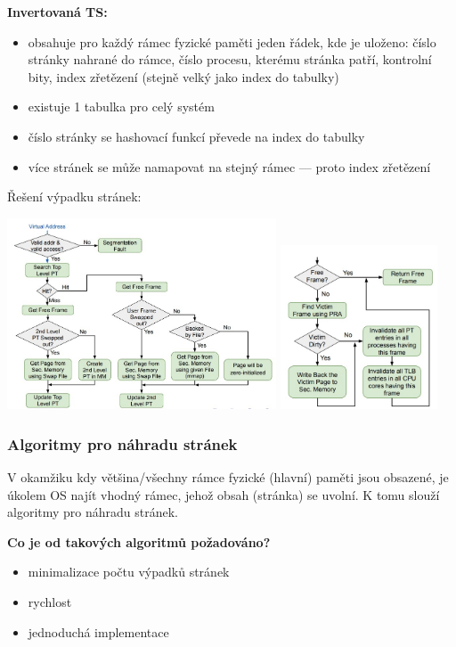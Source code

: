\textbf{Invertovaná TS:}
\begin{itemize}
	\item obsahuje pro každý rámec fyzické paměti jeden řádek, kde je uloženo: číslo stránky nahrané do rámce, číslo procesu, kterému stránka patří, kontrolní bity, index zřetězení (stejně velký jako index do tabulky)
	\item existuje 1 tabulka pro celý systém
	\item číslo stránky se hashovací funkcí převede na index do tabulky
	\item více stránek se může namapovat na stejný rámec --- proto index zřetězení
\end{itemize}

\newpage
Řešení výpadku stránek:

\includegraphics[width=0.6\textwidth]{img/SP-18_0.jpg}
\includegraphics[width=0.35\textwidth]{img/SP-18_1.jpg}

\subsubsection*{Algoritmy pro náhradu stránek}
V okamžiku kdy většina/všechny rámce fyzické (hlavní) paměti jsou obsazené, je úkolem OS najít vhodný rámec, jehož obsah (stránka) se uvolní. K tomu slouží algoritmy pro náhradu stránek.

\textbf{Co je od takových algoritmů požadováno?}
\begin{itemize}
	\item minimalizace počtu výpadků stránek
	\item rychlost
	\item jednoduchá implementace
\end{itemize}


